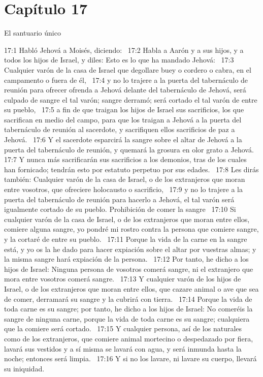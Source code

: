 \section*{Capítulo 17}
El santuario único  

17:1 Habló Jehová a Moisés, diciendo:  
17:2 Habla a Aarón y a sus hijos, y a todos los hijos de Israel, y diles: Esto es lo que ha mandado Jehová:  
17:3 Cualquier varón de la casa de Israel que degollare buey o cordero o cabra, en el campamento o fuera de él,  
17:4 y no lo trajere a la puerta del tabernáculo de reunión para ofrecer ofrenda a Jehová delante del tabernáculo de Jehová, será culpado de sangre el tal varón; sangre derramó; será cortado el tal varón de entre su pueblo,  
17:5 a fin de que traigan los hijos de Israel sus sacrificios, los que sacrifican en medio del campo, para que los traigan a Jehová a la puerta del tabernáculo de reunión al sacerdote, y sacrifiquen ellos sacrificios de paz a Jehová.  
17:6 Y el sacerdote esparcirá la sangre sobre el altar de Jehová a la puerta del tabernáculo de reunión, y quemará la grosura en olor grato a Jehová.  
17:7 Y nunca más sacrificarán sus sacrificios a los demonios, tras de los cuales han fornicado; tendrán esto por estatuto perpetuo por sus edades.  
17:8 Les dirás también: Cualquier varón de la casa de Israel, o de los extranjeros que moran entre vosotros, que ofreciere holocausto o sacrificio,  
17:9 y no lo trajere a la puerta del tabernáculo de reunión para hacerlo a Jehová, el tal varón será igualmente cortado de su pueblo. 
Prohibición de comer la sangre  
17:10 Si cualquier varón de la casa de Israel, o de los extranjeros que moran entre ellos, comiere alguna sangre, yo pondré mi rostro contra la persona que comiere sangre, y la cortaré de entre su pueblo.  
17:11 Porque la vida de la carne en la sangre está, y yo os la he dado para hacer expiación sobre el altar por vuestras almas; y la misma sangre hará expiación de la persona.  
17:12 Por tanto, he dicho a los hijos de Israel: Ninguna persona de vosotros comerá sangre, ni el extranjero que mora entre vosotros comerá sangre.  
17:13 Y cualquier varón de los hijos de Israel, o de los extranjeros que moran entre ellos, que cazare animal o ave que sea de comer, derramará su sangre y la cubrirá con tierra.  
17:14 Porque la vida de toda carne es su sangre; por tanto, he dicho a los hijos de Israel: No comeréis la sangre de ninguna carne, porque la vida de toda carne es su sangre; cualquiera que la comiere será cortado.  
17:15 Y cualquier persona, así de los naturales como de los extranjeros, que comiere animal mortecino o despedazado por fiera, lavará sus vestidos y a sí misma se lavará con agua, y será inmunda hasta la noche; entonces será limpia.  
17:16 Y si no los lavare, ni lavare su cuerpo, llevará su iniquidad.  
